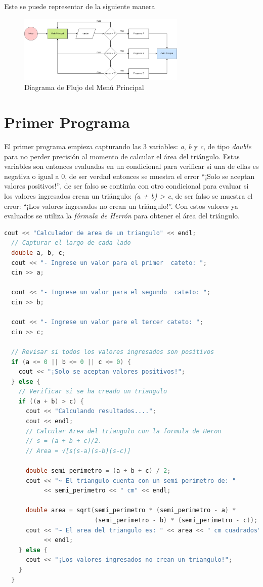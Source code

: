 \documentclass{article}
\begin{document}
Este se puede representar de la siguiente manera

\begin{figure}[H]
    \centering
    \includegraphics[width=8cm]{switch_programa}
    \caption{Diagrama de Flujo del Menú Principal}
\end{figure}

\section{Primer Programa}

El primer programa empieza capturando las 3 variables: \emph{a}, \emph{b} y \emph{c}, de tipo \emph{double} para no perder precisión al momento de calcular el área del triángulo. Estas variables son entonces evaluadas en un condicional para verificar si una de ellas es negativa o igual a 0, de ser verdad entonces se muestra el error ``¡Solo se aceptan valores positivos!'', de ser falso se continúa con otro condicional para evaluar si los valores ingresados crean un triángulo: \emph{(a + b) > c}, de ser falso se muestra el error: ``¡Los valores ingresados no crean un triángulo!''. Con estos valores ya evaluados se utiliza la \emph{fórmula de Herrón} para obtener el área del triángulo.


\begin{lstlisting}[style=mystyle, language=c++]
  cout << "Calculador de area de un triangulo" << endl;
  // Capturar el largo de cada lado
  double a, b, c;
  cout << "- Ingrese un valor para el primer  cateto: ";
  cin >> a;

  cout << "- Ingrese un valor para el segundo  cateto: ";
  cin >> b;

  cout << "- Ingrese un valor pare el tercer cateto: ";
  cin >> c;

  // Revisar si todos los valores ingresados son positivos
  if (a <= 0 || b <= 0 || c <= 0) {
    cout << "¡Solo se aceptan valores positivos!";
  } else {
    // Verificar si se ha creado un triangulo
    if ((a + b) > c) {
      cout << "Calculando resultados....";
      cout << endl;
      // Calcular Area del triangulo con la formula de Heron
      // s = (a + b + c)/2.
      // Area = √[s(s-a)(s-b)(s-c)]

      double semi_perimetro = (a + b + c) / 2;
      cout << "~ El triangulo cuenta con un semi perimetro de: "
           << semi_perimetro << " cm" << endl;

      double area = sqrt(semi_perimetro * (semi_perimetro - a) *
                         (semi_perimetro - b) * (semi_perimetro - c));
      cout << "~ El area del triangulo es: " << area << " cm cuadrados"
           << endl;
    } else {
      cout << "¡Los valores ingresados no crean un triangulo!";
    }
  }
\end{lstlisting}
\end{document}
